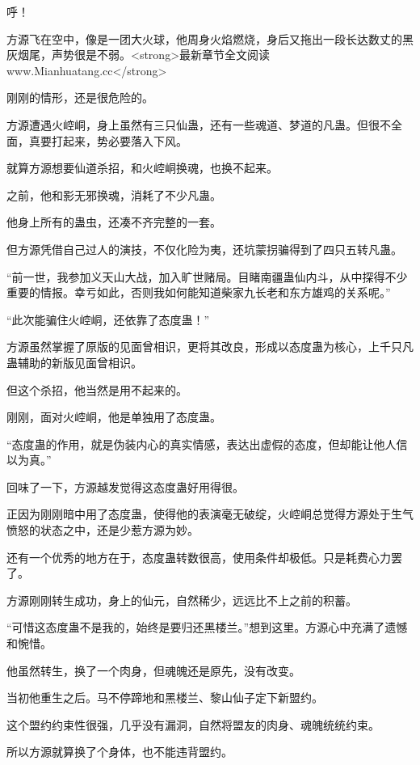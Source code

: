 
\begin{this_body}

呼！

方源飞在空中，像是一团大火球，他周身火焰燃烧，身后又拖出一段长达数丈的黑灰烟尾，声势很是不弱。<strong>最新章节全文阅读www.Mianhuatang.cc</strong>

刚刚的情形，还是很危险的。

方源遭遇火崆峒，身上虽然有三只仙蛊，还有一些魂道、梦道的凡蛊。但很不全面，真要打起来，势必要落入下风。

就算方源想要仙道杀招，和火崆峒换魂，也换不起来。

之前，他和影无邪换魂，消耗了不少凡蛊。

他身上所有的蛊虫，还凑不齐完整的一套。

但方源凭借自己过人的演技，不仅化险为夷，还坑蒙拐骗得到了四只五转凡蛊。

“前一世，我参加义天山大战，加入旷世赌局。目睹南疆蛊仙内斗，从中探得不少重要的情报。幸亏如此，否则我如何能知道柴家九长老和东方雄鸡的关系呢。”

“此次能骗住火崆峒，还依靠了态度蛊！”

方源虽然掌握了原版的见面曾相识，更将其改良，形成以态度蛊为核心，上千只凡蛊辅助的新版见面曾相识。

但这个杀招，他当然是用不起来的。

刚刚，面对火崆峒，他是单独用了态度蛊。

“态度蛊的作用，就是伪装内心的真实情感，表达出虚假的态度，但却能让他人信以为真。”

回味了一下，方源越发觉得这态度蛊好用得很。

正因为刚刚暗中用了态度蛊，使得他的表演毫无破绽，火崆峒总觉得方源处于生气愤怒的状态之中，还是少惹方源为妙。

还有一个优秀的地方在于，态度蛊转数很高，使用条件却极低。只是耗费心力罢了。

方源刚刚转生成功，身上的仙元，自然稀少，远远比不上之前的积蓄。

“可惜这态度蛊不是我的，始终是要归还黑楼兰。”想到这里。方源心中充满了遗憾和惋惜。

他虽然转生，换了一个肉身，但魂魄还是原先，没有改变。

当初他重生之后。马不停蹄地和黑楼兰、黎山仙子定下新盟约。

这个盟约约束性很强，几乎没有漏洞，自然将盟友的肉身、魂魄统统约束。

所以方源就算换了个身体，也不能违背盟约。


\end{this_body}
